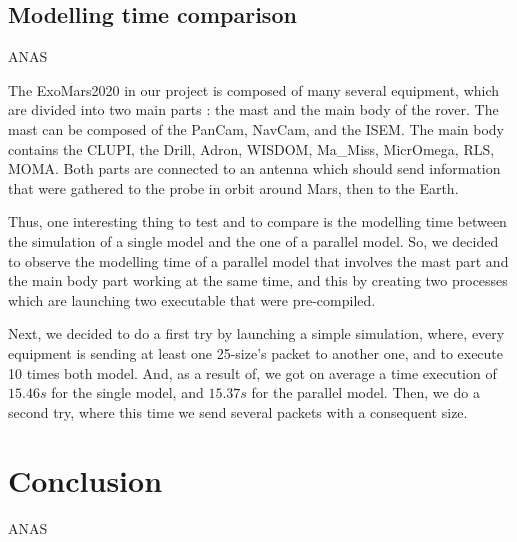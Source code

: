\documentclass[12pt,a4paper]{article}
\begin{document}
\subsection{Modelling time comparison}

ANAS

The ExoMars2020 in our project is composed of many several equipment, which are divided into two main parts : the mast and the main body of the rover. The mast can be composed of the PanCam, NavCam, and the ISEM. The main body contains the CLUPI, the Drill, Adron, WISDOM, Ma\_Miss, MicrOmega, RLS, MOMA. Both parts are connected to an antenna which should send information that were gathered to the probe in orbit around Mars, then to the Earth.\smallbreak

Thus, one interesting thing to test and to compare is the modelling time between the simulation of a single model and the one of a parallel model. So, we decided to observe the modelling time of a parallel model that involves the mast part and the main body part working at the same time, and this by creating two processes which are launching two executable that were pre-compiled.\smallbreak

Next, we decided to do a first try by launching a simple simulation, where, every equipment is sending at least one 25-size's packet to another one, and to execute 10 times both model. And, as a result of, we got on average a time execution of $15.46 s$ for the single model, and $15.37 s$ for the parallel model. Then, we do a second try, where this time we send several packets with a consequent size.\smallbreak

\pagebreak

\section{Conclusion}

ANAS

\pagebreak
\nocite{*}


\end{document}
